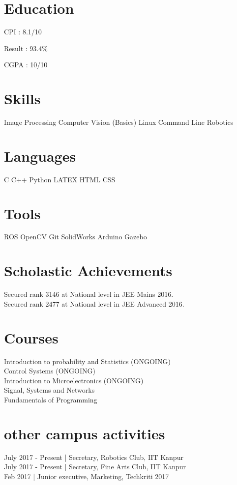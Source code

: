 \sectionsep

\section{Education}

CPI : 8.1/10
\sectionsep

Result : 93.4\%
\sectionsep

CGPA : 10/10
\sectionsep

\section{Skills}
Image Processing \textbullet{} Computer Vision (Basics) \textbullet{} Linux Command Line \textbullet{} Robotics
\section{Languages}
C \textbullet{}   C++ \textbullet{} Python \textbullet{} LATEX \textbullet{} HTML \textbullet{} CSS
\section{Tools}
ROS \textbullet{} OpenCV \textbullet{} Git \textbullet{} SolidWorks \textbullet{} Arduino \textbullet{} Gazebo
\sectionsep
\hfill

\section{Scholastic Achievements}
 Secured rank 3146 at National level in JEE Mains 2016. \\ 
 Secured rank 2477 at National level in JEE Advanced 2016.
\sectionsep

\section{Courses}
Introduction to probability and Statistics (ONGOING) \\
Control Systems (ONGOING) \\
Introduction to Microelectronics (ONGOING) \\
Signal, Systems and Networks \\
Fundamentals of Programming \\
\sectionsep

\section{other campus activities}
July 2017 - Present | Secretary, Robotics Club, IIT Kanpur \\
July 2017 - Present | Secretary, Fine Arts Club, IIT Kanpur \\ 
Feb 2017 | Junior executive, Marketing, Techkriti 2017




